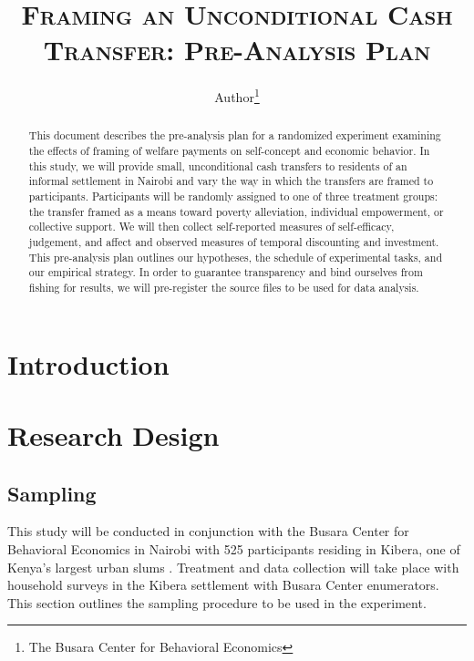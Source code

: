 \documentclass[11pt, a4paper]{article}\usepackage[]{graphicx}\usepackage[]{color}
\begin{document}
\title{\textsc{Framing an Unconditional Cash Transfer: Pre-Analysis Plan}}
\author{Author\footnote{The Busara Center for Behavioral Economics}}

\maketitle

\begin{abstract}

    This document describes the pre-analysis plan for a randomized experiment examining the effects of framing of welfare payments on self-concept and economic behavior. In this study, we will provide small, unconditional cash transfers to residents of an informal settlement in Nairobi and vary the way in which the transfers are framed to participants. Participants will be randomly assigned to one of three treatment groups: the transfer framed as a means toward poverty alleviation, individual empowerment, or collective support. We will then collect self-reported measures of self-efficacy, judgement, and affect and observed measures of temporal discounting and investment. This pre-analysis plan outlines our hypotheses, the schedule of experimental tasks, and our empirical strategy. In order to guarantee transparency and bind ourselves from fishing for results, we will pre-register the source files to be used for data analysis.

\end{abstract}

\newpage

\tableofcontents

\newpage

\section{Introduction}

\section{Research Design}

    \subsection{Sampling}

        This study will be conducted in conjunction with the Busara Center for Behavioral Economics in Nairobi with 525 participants residing in Kibera, one of Kenya's largest urban slums \parencite{haushofer_methodology_2014}. Treatment and data collection will take place with household surveys in the Kibera settlement with Busara Center enumerators. This section outlines the sampling procedure to be used in the experiment.
\end{document}
